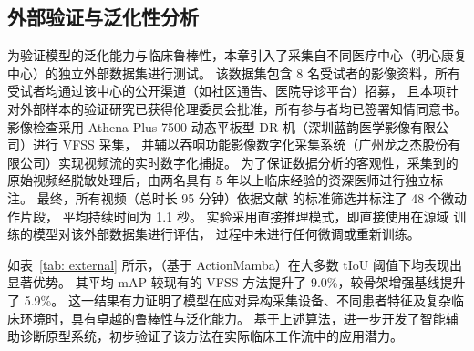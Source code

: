 \subsection{外部验证与泛化性分析}
为验证模型的泛化能力与临床鲁棒性，本章引入了采集自不同医疗中心（明心康复中心）的独立外部数据集进行测试。
该数据集包含 8 名受试者的影像资料，所有受试者均通过该中心的公开渠道（如社区通告、医院导诊平台）招募，
且本项针对外部样本的验证研究已获得伦理委员会批准，所有参与者均已签署知情同意书。
影像检查采用 Athena Plus 7500 动态平板型 DR 机（深圳蓝韵医学影像有限公司）进行 VFSS 采集，
并辅以吞咽功能影像数字化采集系统（广州龙之杰股份有限公司）实现视频流的实时数字化捕捉。
为了保证数据分析的客观性，采集到的原始视频经脱敏处理后，由两名具有 5 年以上临床经验的资深医师进行独立标注。
最终，所有视频（总时长 95 分钟）依据文献 \parencite{ruan2023temporal} 的标准筛选并标注了 48 个微动作片段，
平均持续时间为 1.1 秒。
实验采用直接推理模式，即直接使用在源域 \cite{ruan2023temporal} 训练的模型对该外部数据集进行评估，
过程中未进行任何微调或重新训练。

如表~\ref{tab: external} 所示，\sexyname（基于 ActionMamba）在大多数 tIoU 阈值下均表现出显著优势。
其平均 mAP 较现有的 VFSS 方法提升了 9.0\%，较骨架增强基线提升了 5.9\%。
这一结果有力证明了模型在应对异构采集设备、不同患者特征及复杂临床环境时，具有卓越的鲁棒性与泛化能力。
基于上述算法，进一步开发了智能辅助诊断原型系统，初步验证了该方法在实际临床工作流中的应用潜力。


